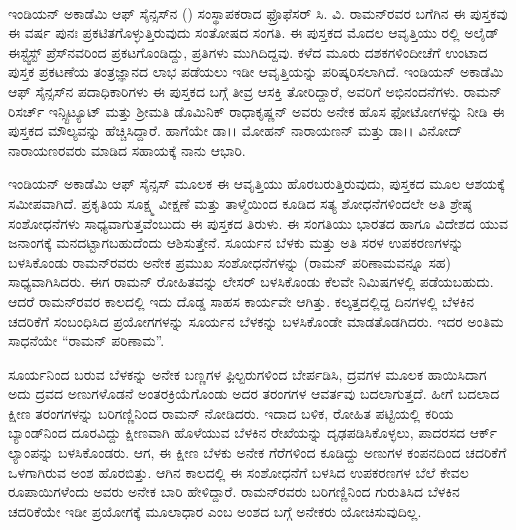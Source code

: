 

~
\thispagestyle{empty}

\vskip 1cm



\vskip 0.7cm



\noindent
ಇಂಡಿಯನ್ ಅಕಾಡೆಮಿ ಆಫ್‌ ಸೈನ್ಸಸ್‍ನ () ಸಂಸ್ಥಾಪಕರಾದ ಫ್ರೊಫೆಸರ್ ಸಿ. ವಿ. ರಾಮನ್‍ರವರ ಬಗೆಗಿನ ಈ ಪುಸ್ತಕವು ಈ ವರ್ಷ ಪುನಃ ಪ್ರಕಟಿತಗೊಳ್ಳುತ್ತಿರುವುದು ಸಂತೋಷದ ಸಂಗತಿ. ಈ ಪುಸ್ತಕದ ಮೊದಲ ಆವೃತ್ತಿಯು ರಲ್ಲಿ ಅಲೈಡ್ ಈಸ್ಟ್\enginline{-}ವೆಸ್ಟ್ ಪ್ರೆಸ್‍ನವರಿಂದ ಪ್ರಕಟಗೊಂಡಿದ್ದು, ಪ್ರತಿಗಳು ಮುಗಿದಿದ್ದವು. ಕಳೆದ ಮೂರು ದಶಕಗಳಿಂದೀಚೆಗೆ ಉಂಟಾದ ಪುಸ್ತಕ ಪ್ರಕಟಣೆಯ ತಂತ್ರಜ್ಞಾನದ ಲಾಭ ಪಡೆಯಲು ಇಡೀ ಆವೃತ್ತಿಯನ್ನು ಪರಿಷ್ಕರಿಸಲಾಗಿದೆ. ಇಂಡಿಯನ್ ಅಕಾಡೆಮಿ ಆಫ್ ಸೈನ್ಸಸ್‍ನ ಪದಾಧಿಕಾರಿಗಳು ಈ ಪುಸ್ತಕದ ಬಗ್ಗೆ ತೀವ್ರ ಆಸಕ್ತಿ ತೋರಿದ್ದಾರೆ, ಅವರಿಗೆ ಅಭಿನಂದನೆಗಳು. ರಾಮನ್ ರಿಸರ್ಚ್ ಇನ್ಸ್ಟಿಟ್ಯೂಟ್ ಮತ್ತು ಶ‍್ರೀಮತಿ ಡೊಮಿನಿಕ್ ರಾಧಾಕೃಷ್ಣನ್ ಅವರು ಅನೇಕ ಹೊಸ ಫೋಟೋಗಳನ್ನು ನೀಡಿ ಈ ಪುಸ್ತಕದ ಮೌಲ್ಯವನ್ನು ಹೆಚ್ಚಿಸಿದ್ದಾರೆ. ಹಾಗೆಯೇ ಡಾ।। ಮೋಹನ್ ನಾರಾಯಣನ್ ಮತ್ತು ಡಾ।। ವಿನೋದ್ ನಾರಾಯಣರವರು ಮಾಡಿದ ಸಹಾಯಕ್ಕೆ ನಾನು ಆಭಾರಿ.

ಇಂಡಿಯನ್ ಅಕಾಡೆಮಿ ಆಫ್‌ ಸೈನ್ಸಸ್ ಮೂಲಕ ಈ ಆವೃತ್ತಿಯು ಹೊರಬರುತ್ತಿರುವುದು, ಪುಸ್ತಕದ ಮೂಲ ಆಶಯಕ್ಕೆ ಸಮೀಪವಾಗಿದೆ. ಪ್ರಕೃತಿಯ ಸೂಕ್ಷ್ಮ ವೀಕ್ಷಣೆ ಮತ್ತು ತಾಳ್ಮೆಯಿಂದ ಕೂಡಿದ ಸತ್ಯ ಶೋಧನೆಗಳಿಂದಲೇ ಅತಿ ಶ್ರೇಷ್ಠ ಸಂಶೋಧನೆಗಳು ಸಾಧ್ಯವಾಗುತ್ತವೆಂಬುದು ಈ ಪುಸ್ತಕದ ತಿರುಳು. ಈ ಸಂಗತಿಯು ಭಾರತದ ಹಾಗೂ ವಿದೇಶದ ಯುವ ಜನಾಂಗಕ್ಕೆ ಮನದಟ್ಟಾಗಬಹುದೆಂದು ಆಶಿಸುತ್ತೇನೆ. ಸೂರ್ಯನ ಬೆಳಕು ಮತ್ತು ಅತಿ ಸರಳ ಉಪಕರಣಗಳನ್ನು ಬಳಸಿಕೊಂಡು ರಾಮನ್‍ರವರು ಅನೇಕ ಪ್ರಮುಖ ಸಂಶೋಧನೆಗಳನ್ನು (ರಾಮನ್ ಪರಿಣಾಮವನ್ನೂ ಸಹ) ಸಾಧ್ಯವಾಗಿಸಿದರು. ಈಗ ರಾಮನ್ ರೋಹಿತವನ್ನು  ಲೇಸರ್ ಬಳಸಿಕೊಂಡು ಕೆಲವೇ ನಿಮಿಷಗಳಲ್ಲಿ ಪಡೆಯಬಹುದು. ಆದರೆ ರಾಮನ್‍ರವರ ಕಾಲದಲ್ಲಿ ಇದು ದೊಡ್ಡ ಸಾಹಸ ಕಾರ್ಯವೇ ಆಗಿತ್ತು. ಕಲ್ಕತ್ತದಲ್ಲಿದ್ದ ದಿನಗಳಲ್ಲಿ ಬೆಳಕಿನ ಚದರಿಕೆಗೆ ಸಂಬಂಧಿಸಿದ ಪ್ರಯೋಗಗಳನ್ನು ಸೂರ್ಯನ ಬೆಳಕನ್ನು ಬಳಸಿಕೊಂಡೇ ಮಾಡತೊಡಗಿದರು. ಇದರ ಅಂತಿಮ ಸಾಧನೆಯೇ “ರಾಮನ್ ಪರಿಣಾಮ”.

ಸೂರ್ಯನಿಂದ ಬರುವ ಬೆಳಕನ್ನು ಅನೇಕ ಬಣ್ಣಗಳ ಫಿ಼ಲ್ಟರುಗಳಿಂದ ಬೇರ್ಪಡಿಸಿ, ದ್ರವಗಳ ಮೂಲಕ ಹಾಯಿಸಿದಾಗ ಅದು ದ್ರವದ ಅಣುಗಳೊಡನೆ ಅಂತರಕ್ರಿಯೆಗೊಂಡು ಅದರ ತರಂಗಗಳ ಆವರ್ತವು ಬದಲಾಗುತ್ತದೆ. ಹೀಗೆ ಬದಲಾದ ಕ್ಷೀಣ ತರಂಗಗಳನ್ನು ಬರಿಗಣ್ಣಿನಿಂದ ರಾಮನ್ ನೋಡಿದರು. ಇದಾದ ಬಳಿಕ, ರೋಹಿತ ಪಟ್ಟಿಯಲ್ಲಿ ಕರಿಯ ಬ್ಯಾಂಡ್‍ನಿಂದ ದೂರವಿದ್ದು ಕ್ಷೀಣವಾಗಿ ಹೊಳೆಯುವ ಬೆಳಕಿನ ರೇಖೆಯನ್ನು ದೃಢಪಡಿಸಿಕೊಳ್ಳಲು, ಪಾದರಸದ ಆರ್ಕ್ ಲ್ಯಾಂಪನ್ನು ಬಳಸಿಕೊಂಡರು. ಆಗ, ಈ ಕ್ಷೀಣ ಬೆಳಕು ಅನೇಕ ಗೆರೆಗಳಿಂದ ಕೂಡಿದ್ದು ಅಣುಗಳ ಕಂಪನದಿಂದ ಚದರಿಕೆಗೆ ಒಳಗಾಗಿರುವ ಅಂಶ ಹೊರಬಿತ್ತು. ಆಗಿನ ಕಾಲದಲ್ಲಿ ಈ ಸಂಶೋಧನೆಗೆ ಬಳಸಿದ ಉಪಕರಣಗಳ ಬೆಲೆ ಕೇವಲ  ರೂಪಾಯಿಗಳೆಂದು ಅವರು ಅನೇಕ ಬಾರಿ ಹೇಳಿದ್ದಾರೆ. ರಾಮನ್‍ರವರು ಬರಿಗಣ್ಣಿನಿಂದ ಗುರುತಿಸಿದ ಬೆಳಕಿನ ಚದರಿಕೆಯೇ ಇಡೀ ಪ್ರಯೋಗಕ್ಕೆ ಮೂಲಾಧಾರ ಎಂಬ ಅಂಶದ ಬಗ್ಗೆ ಅನೇಕರು ಯೋಚಿಸುವುದಿಲ್ಲ.

